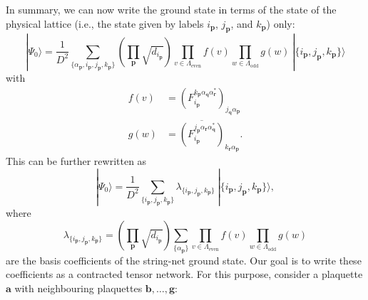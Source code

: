 In summary, we can now write the ground state in terms of the state of the physical lattice (i.e., the state given by labels $i_\mathbf{p}$, $j_\mathbf{p}$, and $k_\mathbf{p}$) only:
\begin{equation}
|\Psi_0\rangle=\frac{1}{D^2}\sum_{\{\alpha_\mathbf{p},i_\mathbf{p},j_\mathbf{p},k_\mathbf{p}\}}\left(\prod_\mathbf{p}\sqrt{d_{i_\mathbf{p}}}\right)\prod_{v\in\Lambda_\mathrm{even}}f(v)\prod_{w\in\Lambda_\mathrm{odd}}g(w)\ |\{i_\mathbf{p},j_\mathbf{p},k_\mathbf{p}\}\rangle
\end{equation}
with
\begin{align}
f(v)&=\left(F_{i_\mathbf{p}}^{k_\mathbf{p}\alpha_\mathbf{q}\alpha_\mathbf{r}^*}\right)_{j_\mathbf{q}\alpha_\mathbf{p}}\\
g(w)&=\overline{\left(F_{i_\mathbf{p}}^{j_\mathbf{p}\alpha_\mathbf{r}\alpha_\mathbf{q}^*}\right)}_{k_\mathbf{r}\alpha_\mathbf{p}}.
\end{align}
This can be further rewritten as
	\begin{equation}
		|\Psi_0\rangle=\frac{1}{D^2}\sum_{\{i_\mathbf{p},j_\mathbf{p},k_\mathbf{p}\}}\lambda_{\{i_\mathbf{p},j_\mathbf{p},k_\mathbf{p}\}}\ |\{i_\mathbf{p},j_\mathbf{p},k_\mathbf{p}\}\rangle,
	\end{equation}
where 
	\begin{equation}
	\label{eq:basiscoeff}
		\lambda_{\{i_\mathbf{p},j_\mathbf{p},k_\mathbf{p}\}}=\left(\prod_\mathbf{p}\sqrt{d_{i_\mathbf{p}}}\right)\sum_{\{\alpha_\mathbf{p}\}}\prod_{v\in\Lambda_\mathrm{even}}f(v)\prod_{w\in\Lambda_\mathrm{odd}}g(w)
	\end{equation}
are the basis coefficients of the string-net ground state. Our goal is to write these coefficients as a contracted tensor network. For this purpose, consider a plaquette $\mathbf{a}$ with neighbouring plaquettes $\mathbf{b},\dots, \mathbf{g}$:
